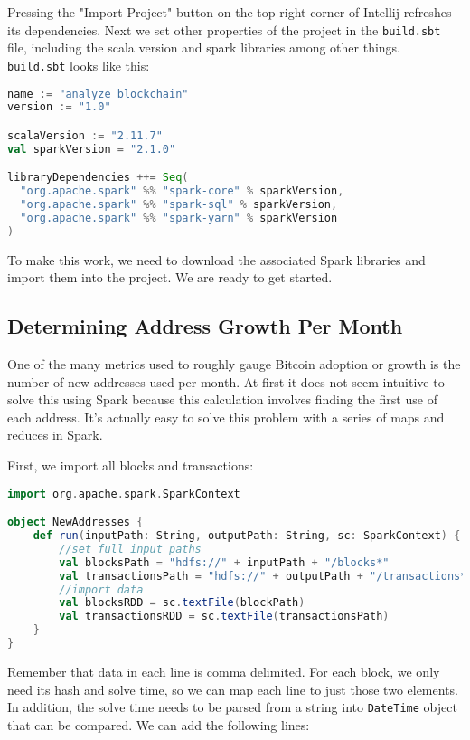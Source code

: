 \documentclass[9pt,twocolumn,twoside]{idsi}
\begin{document}
Pressing the "Import Project" button on the top right corner of Intellij refreshes its dependencies. Next we set other properties of the project in the \lstinline{build.sbt} file, including the scala version and spark libraries among other things. \lstinline{build.sbt} looks like this:

\begin{lstlisting}[language=Scala]
name := "analyze_blockchain"
version := "1.0"

scalaVersion := "2.11.7"
val sparkVersion = "2.1.0"

libraryDependencies ++= Seq(
  "org.apache.spark" %% "spark-core" % sparkVersion,
  "org.apache.spark" %% "spark-sql" % sparkVersion,
  "org.apache.spark" %% "spark-yarn" % sparkVersion
)
\end{lstlisting}

To make this work, we need to download the associated Spark libraries and import them into the project. We are ready to get started.

\subsection{Determining Address Growth Per Month}
One of the many metrics used to roughly gauge Bitcoin adoption or growth is the number of new addresses used per month. At first it does not seem intuitive to solve this using Spark because this calculation involves finding the first use of each address. It's actually easy to solve this problem with a series of maps and reduces in Spark.

First, we import all blocks and transactions:

\begin{lstlisting}[language=Scala]
import org.apache.spark.SparkContext

object NewAddresses {
    def run(inputPath: String, outputPath: String, sc: SparkContext) {
        //set full input paths
        val blocksPath = "hdfs://" + inputPath + "/blocks*"
        val transactionsPath = "hdfs://" + outputPath + "/transactions*"
        //import data
        val blocksRDD = sc.textFile(blockPath)
        val transactionsRDD = sc.textFile(transactionsPath)
    }
}
\end{lstlisting}

Remember that data in each line is comma delimited. For each block, we only need its hash and solve time, so we can map each line to just those two elements. In addition, the solve time needs to be parsed from a string into \lstinline{DateTime} object that can be compared. We can add the following lines:
\end{document}
